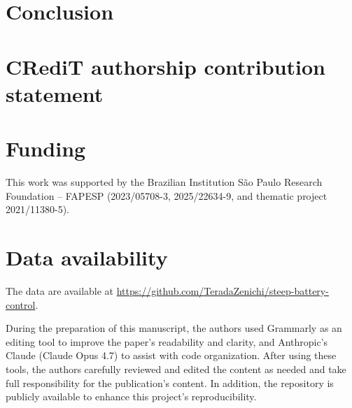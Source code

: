 \documentclass[preprint,12pt, 3p]{elsarticle}
\begin{document}
\section{Conclusion}
\label{sec:conclusion}


\section*{CRediT authorship contribution statement}

\section*{Funding}

This work was supported by the Brazilian Institution São Paulo Research Foundation -- FAPESP (2023/05708-3, 2025/22634-9,  and thematic project 2021/11380-5).

\section*{Data availability}

The data are available at \url{https://github.com/TeradaZenichi/steep-battery-control}.


During the preparation of this manuscript, the authors used Grammarly as an editing tool to improve the paper's readability and clarity, and Anthropic's Claude (Claude Opus 4.7) to assist with code organization. After using these tools, the authors carefully reviewed and edited the content as needed and take full responsibility for the publication's content. In addition, the repository is publicly available to enhance this project's reproducibility.

 

\end{document}
